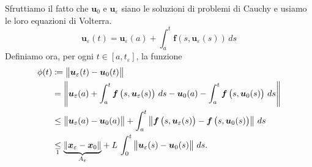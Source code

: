 {\begin{enumerate}
        Sfruttiamo il fatto che $ \bm{u}_0 $ e $ \bm{u}_{ \varepsilon} $ siano le soluzioni di problemi di Cauchy e usiamo le loro equazioni di Volterra. \[
            \bm{u}_{ \varepsilon} (t) =\bm{u}_{ \varepsilon} (a) + \int_{a}^{t} \bm{f}\left(s, \bm{u}_{ \varepsilon}(s)\right) \,ds
        \]Definiamo ora, per ogni $ t \in [a,t_{ \varepsilon} ] $, la funzione \begin{align*}
            \phi(t) &\coloneq \norma{\bm{u}_{ \varepsilon}(t)-\bm{u}_{ 0}(t)}\\ &= \norma{%
            \bm{u}_{ \varepsilon}(a) + \int_{a}^{t} \bm{f}\left(s,\bm{u}_{ \varepsilon}(s)\right) \,ds - \bm{u}_0(a) - \int_{a}^{t} \bm{f}\left(s, \bm{u}_0(s)\right)\,ds 
            }\\ 
            &\le \norma{\bm{u}_{ \varepsilon}(a)-\bm{u}_0(a)} + \int_{a}^{t}\norma{\bm{f}\left(s, \bm{u}_{ \varepsilon}(s)\right) - \bm{f}\left(s, \bm{u}_0(s)\right)}\,ds \\ 
            &\underset{\footnotemark}{\le} \parentesi{A_{ \varepsilon} }{%
                \norma{\bm{x}_{ \varepsilon} -\bm{x}_0} 
            } + L\,\int_{0}^{t}\norma{\bm{u}_{ \varepsilon}(s) - \bm{u}_0(s)}\,ds .
        \end{align*} 


\end{enumerate}}
